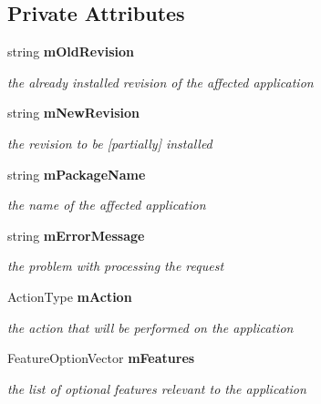 \subsection*{Private Attributes}
\begin{DoxyCompactItemize}
\item 
string {\bf mOldRevision}\label{classActionDescription_a370f83c512798634318c61662c007cc8}

\begin{DoxyCompactList}\small\item\em the already installed revision of the affected application \item\end{DoxyCompactList}\item 
string {\bf mNewRevision}\label{classActionDescription_a982c81ecd58daa7c78336ac9abe315a7}

\begin{DoxyCompactList}\small\item\em the revision to be [partially] installed \item\end{DoxyCompactList}\item 
string {\bf mPackageName}\label{classActionDescription_a8ca9b5385fc382d68b223678343a6c70}

\begin{DoxyCompactList}\small\item\em the name of the affected application \item\end{DoxyCompactList}\item 
string {\bf mErrorMessage}\label{classActionDescription_a05829cf8962e313ef93c497711b036d1}

\begin{DoxyCompactList}\small\item\em the problem with processing the request \item\end{DoxyCompactList}\item 
ActionType {\bf mAction}\label{classActionDescription_a5296c149f84fbd9ca7e964712c97e671}

\begin{DoxyCompactList}\small\item\em the action that will be performed on the application \item\end{DoxyCompactList}\item 
FeatureOptionVector {\bf mFeatures}\label{classActionDescription_ad4aa176baa02a99ffd3483fcd6f5bebb}

\begin{DoxyCompactList}\small\item\em the list of optional features relevant to the application \item\end{DoxyCompactList}\end{DoxyCompactItemize}


